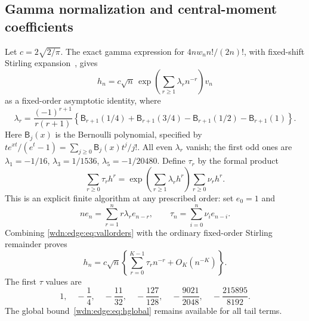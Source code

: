 \documentclass[11pt,letterpaper]{article}
\theoremstyle{remark}\newtheorem{remark}[theorem]{Remark}
\begin{document}
\subsection{Gamma normalization and central-moment coefficients}
Let $c=2\sqrt{2/\pi}$. The exact gamma expression for
$4nw_n n!/(2n)!$, with fixed-shift Stirling expansion~\cite[Eq.~5.11.8]{DLMF}, gives
\begin{equation}\label{wdn:edge:eq:hexp}
 h_n=c\sqrt n\,
 \exp\left(\sum_{r\ge1}\lambda_rn^{-r}\right)v_n
\end{equation}
as a fixed-order asymptotic identity, where
\begin{equation}\label{wdn:edge:eq:lambda}
 \lambda_r=\frac{(-1)^{r+1}}{r(r+1)}
 \left\{\mathsf B_{r+1}(1/4)+\mathsf B_{r+1}(3/4)
       -\mathsf B_{r+1}(1/2)-\mathsf B_{r+1}(1)\right\}.
\end{equation}
Here $\mathsf B_j(x)$ is the Bernoulli polynomial, specified by
$t e^{xt}/(e^t-1)=\sum_{j\ge0}\mathsf B_j(x)t^j/j!$.
All even $\lambda_r$ vanish; the first odd ones are
$\lambda_1=-1/16$, $\lambda_3=1/1536$, $\lambda_5=-1/20480$.
Define $\tau_r$ by the formal product
\begin{equation}\label{wdn:edge:eq:tau}
 \sum_{r\ge0}\tau_rh^r
 =\exp\left(\sum_{r\ge1}\lambda_rh^r\right)
          \sum_{r\ge0}\nu_rh^r.
\end{equation}
This is an explicit finite algorithm at any prescribed order: set
$e_0=1$ and
\[
 n e_n=\sum_{r=1}^n r\lambda_re_{n-r},\qquad
 \tau_n=\sum_{i=0}^n\nu_i e_{n-i}.
\]
Combining \eqref{wdn:edge:eq:vallorders} with the ordinary fixed-order Stirling
remainder proves
\begin{equation}\label{wdn:edge:eq:hallorders}
 h_n=c\sqrt n\left\{\sum_{r=0}^{K-1}\tau_rn^{-r}+O_K(n^{-K})\right\}.
\end{equation}
The first $\tau$ values are
\[
 1,\quad-\frac14,\quad-\frac{11}{32},\quad-\frac{127}{128},\quad
 -\frac{9021}{2048},\quad-\frac{215895}{8192}.
\]
The global bound~\eqref{wdn:edge:eq:hglobal} remains available for all tail terms.
\end{document}
